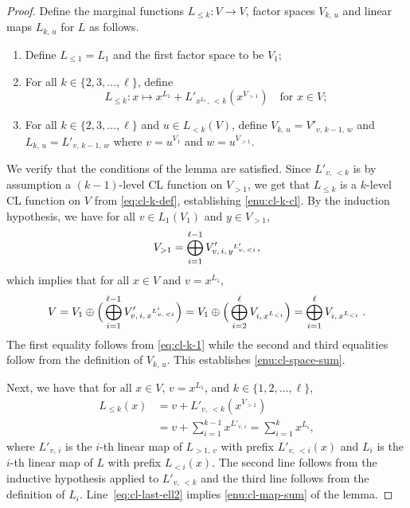 \documentclass[11pt]{article}
\theoremstyle{definition}
\begin{document}
\begin{proof}
  Define the marginal functions $L_{\le k} : V \to V$, factor spaces
  $V_{k,\, u}$ and linear maps $L_{k,\, u}$ for $L$ as follows.
  \begin{enumerate}[label=(\roman*)]
  \item Define $L_{\le 1} = L_1$ and the first factor space to be $V_1$;
  \item For all $k \in \{2, 3, \ldots, \ell\}$, define
    \begin{equation}
      \label{eq:cl-k-def}
      L_{\le k}: x \mapsto x^{L_1} + L'_{x^{L_1},\, <k} (x^{V_{>1}})
      \quad\text{for } x\in V;
    \end{equation}
	\item For all $k \in \{2, 3, \ldots, \ell\}$ and $u \in L_{< k}(V)$, define
    $V_{k,\, u} = V'_{v,\, k-1,\, w}$ and $L_{k,\, u} = L'_{v,\, k-1,\, w}$
    where $v = u^{V_1}$ and $w = u^{V_{>1}}$.
  \end{enumerate}
  We verify that the conditions of the lemma are satisfied.
  Since $L'_{v,\, < k}$ is by assumption a $(k-1)$-level CL function on $V_{>
    1}$, we get that $L_{\leq k}$ is a $k$-level CL function on $V$ from
  \cref{eq:cl-k-def}, establishing \cref{enu:cl-k-cl}.
  By the induction hypothesis, we have for all $v\in L_1(V_1)$ and $y \in
  V_{>1}$,
  \begin{equation}
    \label{eq:cl-k-1}
    V_{>1} = \bigoplus_{i=1}^{\ell-1}
    V'_{\smash{v,\, i, \, y^{L'_{v,\, <i}}}},
  \end{equation}
  which implies that for all $x \in V$ and $v = x^{L_1}$,
  \begin{equation*}
    V = V_1 \oplus \Big ( \bigoplus_{i=1}^{\ell-1}
    V'_{\smash{v,\, i, \, x^{L'_{v,\, <i}}}} \Big)
    = V_1 \oplus \Big (\bigoplus_{i=2}^{\ell} V_{i,\, x^{L_{<i}}} \Big)
    = \bigoplus_{i=1}^\ell V_{i,\, x^{L_{<i}}}\;.
  \end{equation*}
  The first equality follows from \cref{eq:cl-k-1} while the second and third
  equalities follow from the definition of $V_{k,\, u}$.
  This establishes \cref{enu:cl-space-sum}.

  Next, we have that for all $x \in V$, $v = x^{L_1}$, and $k \in
  \{1,2,\ldots,\ell\}$,
  \begin{align}
    \label{eq:cl-last-ell}
    L_{\leq k}(x)
    & = v + L'_{v,\, <k} (x^{V_{>1}}) \\
    & = v + \sum_{i=1}^{k-1} x^{L'_{v,\, i}}
    = \sum_{i = 1}^{k} x^{L_{i}}, \label{eq:cl-last-ell2}
  \end{align}
  where $L'_{v,\, i}$ is the $i$-th linear map of $L_{>1,\, v}$ with prefix
  $L'_{v,\, <i}(x)$ and $L_i$ is the $i$-th linear map of $L$ with prefix
  $L_{<i}(x)$.
  The second line follows from the inductive hypothesis applied to $L'_{v,\,
    <k}$ and the third line follows from the definition of $L_{i}$.
  Line~\eqref{eq:cl-last-ell2} implies \cref{enu:cl-map-sum} of the lemma.
  

\end{proof}
\end{document}
